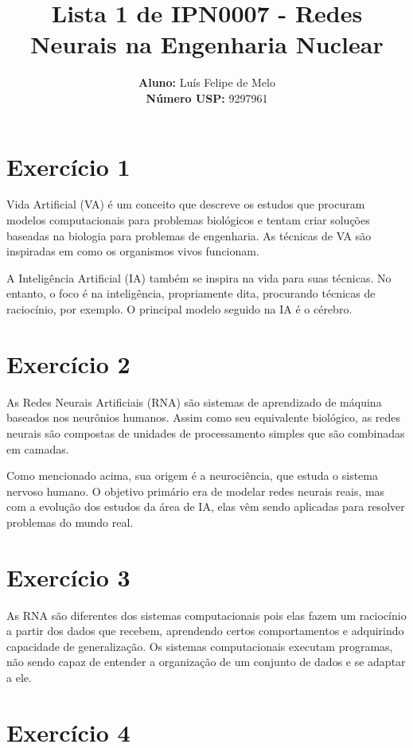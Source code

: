 \documentclass[a4]{article}
\title{\textbf{Lista 1 de IPN0007 - Redes Neurais na Engenharia Nuclear}}
\author{
    \textbf{Aluno:} Luís Felipe de Melo  \\
    \textbf{Número USP:} 9297961
    }
\date{}
\begin{document}
\maketitle

\section*{Exercício 1}

Vida Artificial (VA) é um conceito que descreve os estudos que procuram modelos computacionais para problemas biológicos e tentam criar soluções baseadas na biologia para problemas de engenharia. As técnicas de VA são inspiradas em como os organismos vivos funcionam.

A Inteligência Artificial (IA) também se inspira na vida para suas técnicas. No entanto, o foco é na inteligência, propriamente dita, procurando técnicas de raciocínio, por exemplo. O principal modelo seguido na IA é o cérebro.

\section*{Exercício 2}

As Redes Neurais Artificiais (RNA) são sistemas de aprendizado de máquina baseados nos neurônios humanos. Assim como seu equivalente biológico, as redes neurais são compostas de unidades de processamento simples que são combinadas em camadas.

Como mencionado acima, sua origem é a neurociência, que estuda o sistema nervoso humano. O objetivo primário era de modelar redes neurais reais, mas com a evolução dos estudos da área de IA, elas vêm sendo aplicadas para resolver problemas do mundo real.

\section*{Exercício 3}

As RNA são diferentes dos sistemas computacionais pois elas fazem um raciocínio a partir dos dados que recebem, aprendendo certos comportamentos e adquirindo capacidade de generalização. Os sistemas computacionais executam programas, não sendo capaz de entender a organização de um conjunto de dados e se adaptar a ele.

\section*{Exercício 4}
\end{document}
